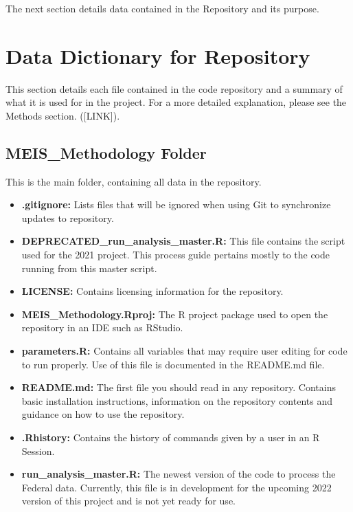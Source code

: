 \documentclass[
]{book}
\providecommand{\tightlist}{%
  \setlength{\itemsep}{0pt}\setlength{\parskip}{0pt}}
\begin{document}
The next section details data contained in the Repository and its purpose.

\hypertarget{data-dictionary-for-repository}{%
\chapter{Data Dictionary for Repository}\label{data-dictionary-for-repository}}

This section details each file contained in the code repository and a summary of what it is used for in the project. For a more detailed explanation, please see the Methods section. ({[}LINK{]}).

\hypertarget{meis_methodology-folder}{%
\section{MEIS\_Methodology Folder}\label{meis_methodology-folder}}

This is the main folder, containing all data in the repository.

\begin{itemize}
\tightlist
\item
  \textbf{.gitignore:} Lists files that will be ignored when using Git to synchronize updates to repository.
\item
  \textbf{DEPRECATED\_run\_analysis\_master.R:} This file contains the script used for the 2021 project. This process guide pertains mostly to the code running from this master script.
\item
  \textbf{LICENSE:} Contains licensing information for the repository.
\item
  \textbf{MEIS\_Methodology.Rproj:} The R project package used to open the repository in an IDE such as RStudio.
\item
  \textbf{parameters.R:} Contains all variables that may require user editing for code to run properly. Use of this file is documented in the README.md file.
\item
  \textbf{README.md:} The first file you should read in any repository. Contains basic installation instructions, information on the repository contents and guidance on how to use the repository.
\item
  \textbf{.Rhistory:} Contains the history of commands given by a user in an R Session.
\item
  \textbf{run\_analysis\_master.R:} The newest version of the code to process the Federal data. Currently, this file is in development for the upcoming 2022 version of this project and is not yet ready for use.
\end{itemize}
\end{document}
